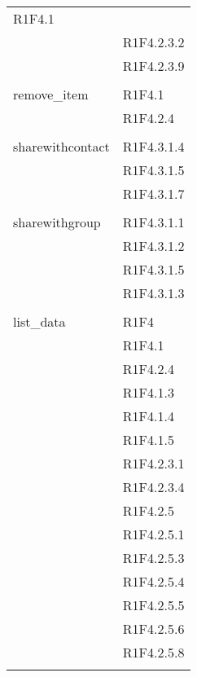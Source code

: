 \begin{center}
\begin{longtable}{|p{7cm}|p{5cm}|}
R1F4.1 \\ & R1F4.2.3.2 \\ & R1F4.2.3.9 \\ & \\ \hline
		remove\_item & R1F4.1 \\ & R1F4.2.4 \\ & \\ \hline
		sharewithcontact & R1F4.3.1.4 \\ & R1F4.3.1.5 \\ & R1F4.3.1.7 \\ & \\ \hline
		sharewithgroup & R1F4.3.1.1 \\ & R1F4.3.1.2 \\ & R1F4.3.1.5 \\ & R1F4.3.1.3 \\ & \\ \hline
		list\_data & R1F4 \\ & R1F4.1 \\ & R1F4.2.4 \\ & R1F4.1.3 \\ & R1F4.1.4 \\ & R1F4.1.5 \\ & R1F4.2.3.1 \\ & R1F4.2.3.4 \\ & R1F4.2.5 \\ & R1F4.2.5.1 \\ & R1F4.2.5.3 \\ & R1F4.2.5.4 \\ & R1F4.2.5.5 \\ & R1F4.2.5.6 \\ & R1F4.2.5.8 \\ & \\ \hline

\end{longtable}
\end{center}
